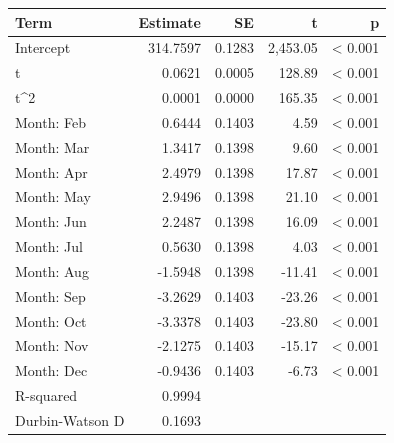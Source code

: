 
\begin{tabular}[t]{lrrrr}
\toprule
Term & Estimate & SE & t & p\\
\midrule
Intercept & 314.7597 & 0.1283 & 2,453.05 & < 0.001\\
t & 0.0621 & 0.0005 & 128.89 & < 0.001\\
t\textasciicircum{}2 & 0.0001 & 0.0000 & 165.35 & < 0.001\\
Month: Feb & 0.6444 & 0.1403 & 4.59 & < 0.001\\
Month: Mar & 1.3417 & 0.1398 & 9.60 & < 0.001\\
Month: Apr & 2.4979 & 0.1398 & 17.87 & < 0.001\\
Month: May & 2.9496 & 0.1398 & 21.10 & < 0.001\\
Month: Jun & 2.2487 & 0.1398 & 16.09 & < 0.001\\
Month: Jul & 0.5630 & 0.1398 & 4.03 & < 0.001\\
Month: Aug & -1.5948 & 0.1398 & -11.41 & < 0.001\\
Month: Sep & -3.2629 & 0.1403 & -23.26 & < 0.001\\
Month: Oct & -3.3378 & 0.1403 & -23.80 & < 0.001\\
Month: Nov & -2.1275 & 0.1403 & -15.17 & < 0.001\\
Month: Dec & -0.9436 & 0.1403 & -6.73 & < 0.001\\
R-squared & 0.9994 &  &  & \\
Durbin-Watson D & 0.1693 &  &  & \\
\bottomrule
\end{tabular}
